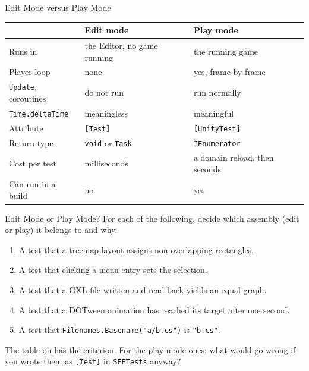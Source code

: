 \begin{frame}{Edit Mode versus Play Mode}
  \begin{center}
    \footnotesize
    \begin{tabular}{lll}
      \hline
      & \textbf{Edit mode} & \textbf{Play mode}\\
      \hline
      Runs in            & the Editor, no game running & the running game\\
      Player loop        & none                        & yes, frame by frame\\
      \texttt{Update}, coroutines & do not run         & run normally\\
      \texttt{Time.deltaTime}     & meaningless        & meaningful\\
      Attribute          & \texttt{[Test]}             & \texttt{[UnityTest]}\\
      Return type        & \texttt{void} or \texttt{Task} & \texttt{IEnumerator}\\
      Cost per test      & milliseconds                & a domain reload, then seconds\\
      Can run in a build & no                          & yes\\
      \hline
    \end{tabular}
  \end{center}
  \vspace{2ex}

\end{frame}

\begin{exerciseframe}{Edit Mode or Play Mode?}
  For each of the following, decide which assembly (edit or play) it belongs to and why.
  \vspace{1ex}

  \begin{enumerate}
    \item A test that a treemap layout assigns non-overlapping rectangles.
    \item A test that clicking a menu entry sets the selection.
    \item A test that a GXL file written and read back yields an equal graph.
    \item A test that a DOTween animation has reached its target after one
      second.
    \item A test that \texttt{Filenames.Basename("a/b.cs")} is \texttt{"b.cs"}.
  \end{enumerate}
  \vspace{1ex}

  The table on  has the criterion. For the play-mode
  ones: what would go wrong if you wrote them as \texttt{[Test]} in
  \texttt{SEETests} anyway?
\end{exerciseframe}

